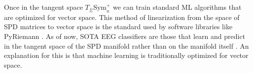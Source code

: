 \documentclass[../../../main.tex]{subfiles}
\begin{document}
Once in the tangent space $T_{\bar{\Sigma}}\text{Sym}_n^+$ we can train standard ML algorithms that are optimized for vector space. This method of linearization from the space of SPD matrices to vector space is the standard used by software libraries like PyRiemann \autocite{Barachant2025}. As of now, SOTA EEG classifiers are those that learn and predict in the tangent space of the SPD manifold rather than on the manifold itself \autocite{Barachant2012, Chevallier2018}. An explanation for this is that machine learning is traditionally optimized for vector space.
\end{document}
